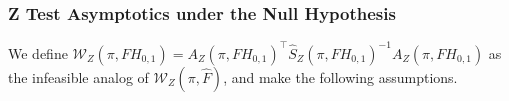 \documentclass[12pt]{article}
\newcommand*{\tran}{\intercal}
\theoremstyle{plain}
\numberwithin{equation}{section}
\begin{document}
\subsubsection{Z Test Asymptotics under the Null Hypothesis}
We define $\mathscr{W}_Z(\pi, FH_{0, 1}) = A_Z(\pi, FH_{0, 1})^\tran \widehat{S}_Z (\pi, FH_{0, 1})^{-1} A_Z(\pi, FH_{0, 1})$ as the infeasible analog of $\mathscr{W}_Z(\pi, \widehat{F})$, and make the following assumptions.
\end{document}
